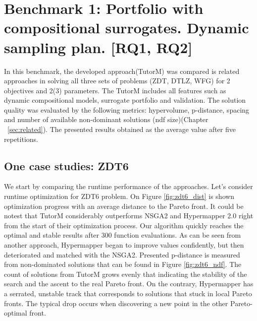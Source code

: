 \section{Benchmark 1: Portfolio with compositional surrogates. Dynamic sampling plan. [RQ1, RQ2]}
    In this benchmark, the developed approach(TutorM) was compared is related approaches in solving all three sets of problems (ZDT, DTLZ, WFG) for 2 objectives and 2(3) parameters. The TutorM includes all features such as dynamic compositional models, surrogate portfolio and validation. 
    The solution quality was evaluated by the following metrics: hypervolume, p-distance, spacing and number of available non-dominant solutions (ndf size)(Chapter ~\ref{sec:related}). The presented results obtained as the average value after five repetitions.

    \subsection*{One case studies: ZDT6}
    We start by comparing the runtime performance of the approaches. Let's consider runtime optimization for ZDT6 problem. On Figure \ref{fig:zdt6_dist} is shown optimization progress with an average distance to the Pareto front.  It could be notest that TutorM considerably outperforms NSGA2 and Hypermapper 2.0 right from the start of their optimization process. Our algorithm quickly reaches the optimal and stable results after 300 function evaluations. As can be seen from another approach, Hypermapper began to improve values confidently, but then deteriorated and matched with the NSGA2. Presented p-distance is measured from non-dominated solutions that can be found in Figure \ref{fig:zdt6_ndf}. The count of solutions from TutorM grows evenly that indicating the stability of the search and the ascent to the real Pareto front. On the contrary, Hypermapper has a serrated, unstable track that corresponds to solutions that stuck in local Pareto fronts. The typical drop occurs when discovering a new point in the other Pareto-optimal front. %

